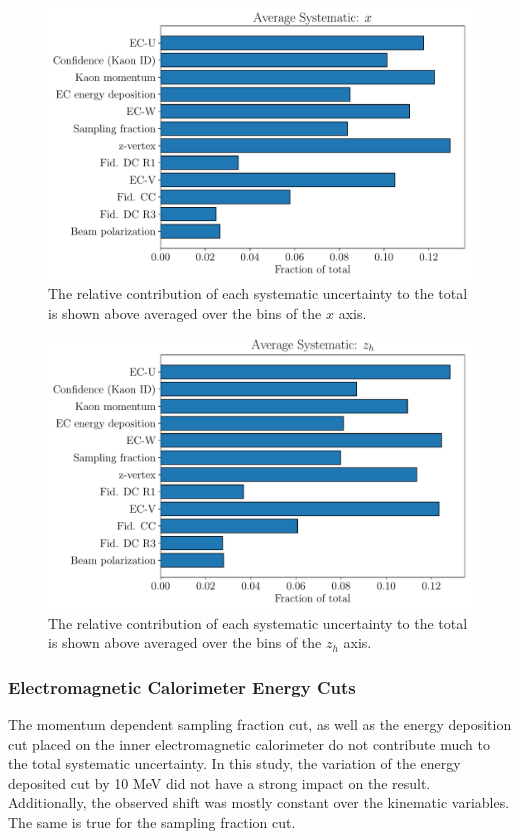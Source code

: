 \begin{figure}
	\centering
	\includegraphics[width=16cm]{image/plots/kaon-bsa/bar-systematics-x.pdf}
	\caption{The relative contribution of each systematic uncertainty to the total is shown above averaged over the bins of the $x$ axis.}
\end{figure}

\begin{figure}
	\centering
	\includegraphics[width=16cm]{image/plots/kaon-bsa/bar-systematics-z.pdf}
	\caption{The relative contribution of each systematic uncertainty to the total is shown above averaged over the bins of the $z_h$ axis.}
\end{figure}

\subsubsection*{Electromagnetic Calorimeter Energy Cuts}
The momentum dependent sampling fraction cut, as well as the energy deposition cut placed on the inner electromagnetic calorimeter do not contribute much to the total systematic uncertainty.  In this study, the variation of the energy deposited cut by 10 MeV did not have a strong impact on the result.  Additionally, the observed shift was mostly constant over the kinematic variables.  The same is true for the sampling fraction cut.

